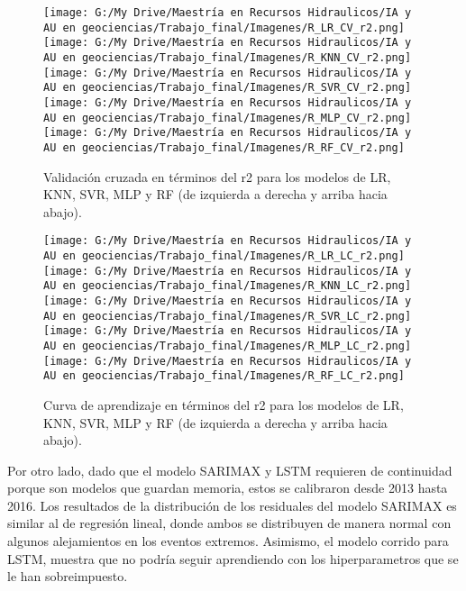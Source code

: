 \documentclass[draft]{agujournal2019}
\begin{document}
\begin{figure}[!]
	\centering%
	\texttt{[image: G:/My Drive/Maestría en Recursos Hidraulicos/IA y AU en geociencias/Trabajo\_final/Imagenes/R\_LR\_CV\_r2.png]}
	\texttt{[image: G:/My Drive/Maestría en Recursos Hidraulicos/IA y AU en geociencias/Trabajo\_final/Imagenes/R\_KNN\_CV\_r2.png]}
	\texttt{[image: G:/My Drive/Maestría en Recursos Hidraulicos/IA y AU en geociencias/Trabajo\_final/Imagenes/R\_SVR\_CV\_r2.png]}\\
	\texttt{[image: G:/My Drive/Maestría en Recursos Hidraulicos/IA y AU en geociencias/Trabajo\_final/Imagenes/R\_MLP\_CV\_r2.png]}
	\texttt{[image: G:/My Drive/Maestría en Recursos Hidraulicos/IA y AU en geociencias/Trabajo\_final/Imagenes/R\_RF\_CV\_r2.png]}
	\caption{Validación cruzada en términos del r2 para los modelos de LR, KNN, SVR, MLP y RF (de izquierda a derecha y arriba hacia abajo).} \label{fig:kfold}
\end{figure}


\begin{figure}[!]
	\centering%
	\texttt{[image: G:/My Drive/Maestría en Recursos Hidraulicos/IA y AU en geociencias/Trabajo\_final/Imagenes/R\_LR\_LC\_r2.png]}
	\texttt{[image: G:/My Drive/Maestría en Recursos Hidraulicos/IA y AU en geociencias/Trabajo\_final/Imagenes/R\_KNN\_LC\_r2.png]}
	\texttt{[image: G:/My Drive/Maestría en Recursos Hidraulicos/IA y AU en geociencias/Trabajo\_final/Imagenes/R\_SVR\_LC\_r2.png]}\\
	\texttt{[image: G:/My Drive/Maestría en Recursos Hidraulicos/IA y AU en geociencias/Trabajo\_final/Imagenes/R\_MLP\_LC\_r2.png]}
	\texttt{[image: G:/My Drive/Maestría en Recursos Hidraulicos/IA y AU en geociencias/Trabajo\_final/Imagenes/R\_RF\_LC\_r2.png]}
	\caption{Curva de aprendizaje en términos del r2 para los modelos de LR, KNN, SVR, MLP y RF (de izquierda a derecha y arriba hacia abajo).} \label{fig:LC}
\end{figure}

Por otro lado, dado que el modelo SARIMAX y LSTM requieren de continuidad porque son modelos que guardan memoria, estos se calibraron desde 2013 hasta 2016. Los resultados de la distribución de los residuales del modelo SARIMAX es similar al de regresión lineal, donde ambos se distribuyen de manera normal con algunos alejamientos en los eventos extremos. Asimismo, el modelo corrido para LSTM, muestra que no podría seguir aprendiendo con los hiperparametros que se le han sobreimpuesto.
\end{document}
